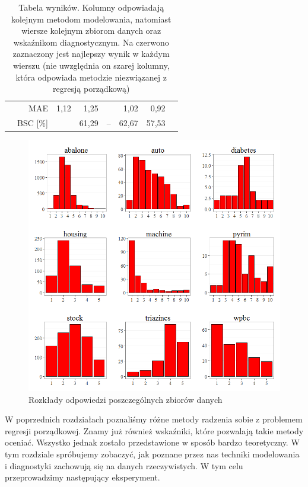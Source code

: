\documentclass{mini}
\begin{document}
\begin{table}[!htbp]
\begin{tabular}{rrrrrrrr}
   & MAE \color{white}{[\%]} & 1,12 & 1,25 & \color{red}{0,86} & 1,02 & 0,92 &\color{gray}{1,29}\\ 
   & BSC [\%] & \color{red}{67,59} & 61,29 & -- & 62,67 & 57,53 &\color{gray}{40,48}\\ 
   \hline
\end{tabular}
\caption{Tabela wyników. Kolumny odpowiadają kolejnym metodom modelowania, natomiast wiersze kolejnym zbiorom danych oraz wskaźnikom diagnostycznym. Na czerwono zaznaczony jest najlepszy wynik w każdym wierszu (nie uwzględnia on szarej kolumny, która odpowiada metodzie niezwiązanej z regresją porządkową)}
\label{wyniki} 
\end{table}

\begin{figure}[h!]
\begin{center}
\includegraphics[width=\textwidth]{graphics/rozklad_odpowiedzi.png}
\end{center}
\caption{Rozkłady odpowiedzi poszczególnych zbiorów danych}
\label{rozkladdanych}
\end{figure}

W poprzednich rozdziałach poznaliśmy różne metody radzenia sobie z problemem regresji porządkowej. Znamy już również wskaźniki, które pozwalają takie metody oceniać. Wszystko jednak zostało przedstawione w sposób bardzo teoretyczny. W tym rozdziale spróbujemy zobaczyć, jak poznane przez nas techniki modelowania i diagnostyki zachowują się na danych rzeczywistych. W tym celu przeprowadzimy następujący eksperyment.
\end{document}
